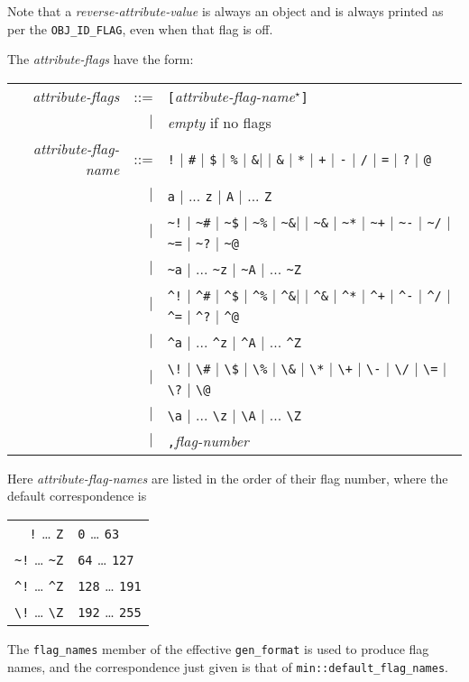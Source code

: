 \documentclass[12pt]{article}
\newcommand{\EOL}{\penalty \exhyphenpenalty}
\begin{document}
Note that a {\em reverse-attribute-value} is always an object and is
always printed as per the {\tt OBJ\_\EOL ID\_\EOL FLAG}, even when
that flag is off.

The {\em attribute-flags} have the form:

\begin{tabular}{rrl}
{\em attribute-flags}
    & ::= & \verb|[|{\em attribute-flag-name}$^\star$\verb|]| \\
    & $|$ & {\em empty} \hspace*{2in}if no flags \\
{\em attribute-flag-name} & ::= &
        \verb|!| $|$ \verb|#| $|$ \verb|$| $|$ \verb|%| $|$ \verb|&|
    $|$ \verb|*| $|$ \verb|+| $|$ \verb|-| $|$ \verb|/| $|$ \verb|=|
    $|$ \verb|?| $|$ \verb|@| \\
& $|$ & \verb|a| $|$ ... \verb|z| $|$ \verb|A| $|$ ... \verb|Z| \\
& $|$ & \verb|~!| $|$ \verb|~#| $|$ \verb|~$| $|$ \verb|~%| $|$ \verb|~&|
    $|$ \verb|~*| $|$ \verb|~+| $|$ \verb|~-| $|$ \verb|~/| $|$ \verb|~=|
    $|$ \verb|~?| $|$ \verb|~@| \\
& $|$ & \verb|~a| $|$ ... \verb|~z| $|$ \verb|~A| $|$ ... \verb|~Z| \\
& $|$ & \verb|^!| $|$ \verb|^#| $|$ \verb|^$| $|$ \verb|^%| $|$ \verb|^&|
    $|$ \verb|^*| $|$ \verb|^+| $|$ \verb|^-| $|$ \verb|^/| $|$ \verb|^=|
    $|$ \verb|^?| $|$ \verb|^@| \\
& $|$ & \verb|^a| $|$ ... \verb|^z| $|$ \verb|^A| $|$ ... \verb|^Z| \\
& $|$ & \verb|\!| $|$ \verb|\#| $|$ \verb|\$| $|$ \verb|\%| $|$ \verb|\&|
    $|$ \verb|\*| $|$ \verb|\+| $|$ \verb|\-| $|$ \verb|\/| $|$ \verb|\=|
    $|$ \verb|\?| $|$ \verb|\@| \\
& $|$ & \verb|\a| $|$ ... \verb|\z| $|$ \verb|\A| $|$ ... \verb|\Z| \\
& $|$ & \verb|,|{\em flag-number}
\end{tabular}

Here {\em attribute-flag-names} are listed in the order of their flag number,
where the default correspondence is
\begin{center}
\begin{tabular}{r@{~correspond to flag numbers~}l}
\verb|!| \ldots{} \verb|Z| & \verb|0| \ldots{} \verb|63| \\
\verb|~!| \ldots{} \verb|~Z| & \verb|64| \ldots{} \verb|127| \\
\verb|^!| \ldots{} \verb|^Z| & \verb|128| \ldots{} \verb|191| \\
\verb|\!| \ldots{} \verb|\Z| & \verb|192| \ldots{} \verb|255| \\
\end{tabular}
\end{center}
The {\tt flag\_names} member of the effective {\tt gen\_format}
is used to produce flag names, and the correspondence just
given is that of {\tt min::\EOL default\_\EOL flag\_\EOL names}.
\end{document}
